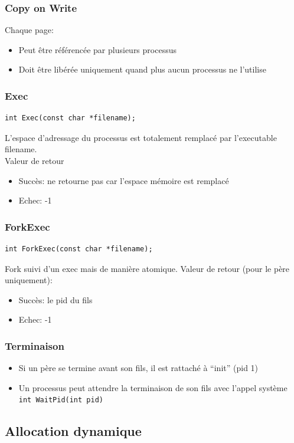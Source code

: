 \documentclass{beamer}
\begin{document}
\begin{frame}
  \frametitle{Copy on Write}
  Chaque page:
  \begin{itemize}
  \item Peut être référencée par plusieurs processus
  \item Doit être libérée uniquement quand plus aucun processus ne l'utilise
  \end{itemize}
\end{frame}

\begin{frame}[fragile]
  \frametitle{Exec}
\begin{verbatim}
int Exec(const char *filename);
\end{verbatim}
L'espace d'adressage du processus est totalement remplacé par l'executable filename.\\

Valeur de retour
\begin{itemize}
  \item Succès: ne retourne pas car l'espace mémoire est remplacé
  \item Echec: -1
\end{itemize}
\end{frame}

\begin{frame}[fragile]
  \frametitle{ForkExec}
\begin{verbatim}
int ForkExec(const char *filename);
\end{verbatim}
Fork suivi d'un exec mais de manière atomique.
Valeur de retour (pour le père uniquement):
\begin{itemize}
\item Succès: le pid du fils
\item Echec: -1
\end{itemize}
\end{frame}

\begin{frame}
  \frametitle{Terminaison}
  \begin{itemize}
    \item Si un père se termine avant son fils, il est rattaché à ``init'' (pid 1)
    \item Un processus peut attendre la terminaison de son fils avec l'appel système \texttt{int WaitPid(int pid)}
  \end{itemize}

\end{frame}


\subsection{Allocation dynamique}
\end{document}
